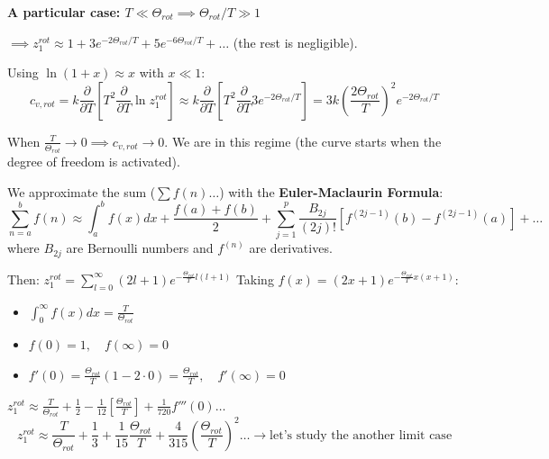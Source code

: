\documentclass[12pt,a4paper]{report}
\newcommand{\esp}{\vspace{0.5cm}}
\begin{document}
	\esp
	
	\textbf{A particular case: $T \ll \Theta_{rot} \implies \Theta_{rot}/T \gg 1$}
	
	\esp
	
	$\implies z_1^{rot} \approx 1 + 3 e^{-2\Theta_{rot}/T} + 5 e^{-6\Theta_{rot}/T} + \dots$ (the rest is negligible).
	
	Using $\ln(1+x) \approx x$ with $x \ll 1$:
	\begin{equation}
		c_{v,rot} = k \frac{\partial}{\partial T} \left[ T^2 \frac{\partial}{\partial T} \ln z_1^{rot} \right] \approx k \frac{\partial}{\partial T} \left[ T^2 \frac{\partial}{\partial T} 3 e^{-2\Theta_{rot}/T} \right] = 3k \left( \frac{2\Theta_{rot}}{T} \right)^2 e^{-2\Theta_{rot}/T}
	\end{equation}
	
	When $\frac{T}{\Theta_{rot}} \to 0 \implies c_{v,rot} \to 0$. We are in this regime (the curve starts when the degree of freedom is activated).
	
	\esp
	
	We approximate the sum ($\sum f(n) \dots$) with the \textbf{Euler-Maclaurin Formula}:
	\begin{equation}
		\sum_{n=a}^b f(n) \approx \int_a^b f(x)dx + \frac{f(a)+f(b)}{2} + \sum_{j=1}^p \frac{B_{2j}}{(2j)!} [f^{(2j-1)}(b) - f^{(2j-1)}(a)] + \dots
	\end{equation}
	where $B_{2j}$ are Bernoulli numbers and $f^{(n)}$ are derivatives.
	
	\esp
	
	Then:
	$z_1^{rot} = \sum_{l=0}^{\infty} (2l+1) e^{-\frac{\Theta_{rot}}{T} l(l+1)}$
	Taking $f(x) = (2x+1) e^{-\frac{\Theta_{rot}}{T} x(x+1)}$:
	\begin{itemize}
		\item $\int_0^\infty f(x)dx = \frac{T}{\Theta_{rot}}$
		\item $f(0) = 1, \quad f(\infty) = 0$
		\item $f'(0) = \frac{\Theta_{rot}}{T} (1 - 2 \cdot 0) = \frac{\Theta_{rot}}{T}, \quad f'(\infty) = 0$
	\end{itemize}
	
	\esp
	
	$z_1^{rot} \approx \frac{T}{\Theta_{rot}} + \frac{1}{2} - \frac{1}{12} \left[ \frac{\Theta_{rot}}{T} \right] + \frac{1}{720} f'''(0) \dots$
	\begin{equation}
		z_1^{rot} \approx \frac{T}{\Theta_{rot}} + \frac{1}{3} + \frac{1}{15} \frac{\Theta_{rot}}{T} + \frac{4}{315} \left( \frac{\Theta_{rot}}{T} \right)^2 \dots \rightarrow \text{let's study the another limit case}
	\end{equation}
	
\end{document}
